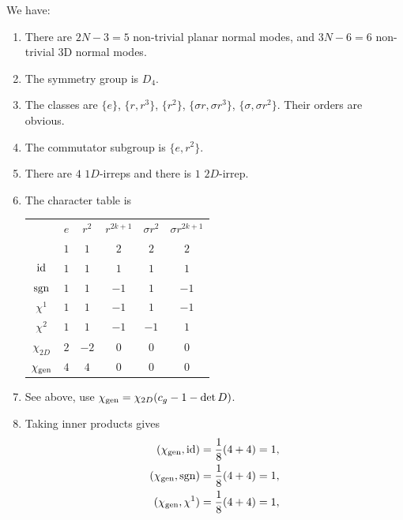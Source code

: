 \documentclass[11pt]{article}
\begin{document}
\begin{eexample}
    [Square]
    We have:
    \begin{enumerate}
        \item There are $2N - 3 = 5$ non-trivial planar normal modes,
        and $3N - 6 = 6$ non-trivial 3D normal modes.
        \item The symmetry group is $D_4$.
        \item The classes are $\{ e \}$, $\{ r, r^3 \}$, $\{ r^2 \}$, $\{ \sigma r, \sigma r^3 \}$, $\{ \sigma, \sigma r^2 \}$.
        Their orders are obvious.
        \item The commutator subgroup is $\{e, r^2 \}$.
        \item There are $4$ $1D$-irreps and there is $1$ $2D$-irrep.
        \item The character table is
        \begin{table}[H]
            \centering 
            \begin{tabular}{|c|c|c|c|c|c|}
                \hline
                & $e$ & $r^2$ & $r^{2k + 1}$ & $\sigma r^2$ & $\sigma r^{2k + 1}$\\
                & $1$ & $1$ & $2$ & $2$ & $2$\\
                \hline
                $\id$ & $1$ & $1$ & $1$ & $1$ & $1$\\
                $\sgn$ & $1$ & $1$ & $-1$ & $1$ & $-1$\\
                $\chi^1$ & $1$ & $1$ & $-1$ & $1$ & $-1$\\
                $\chi^2$ & $1$ & $1$ & $-1$ & $-1$ & $1$\\
                $\chi_{2D}$ & $2$ & $-2$ & $0$ & $0$ & $0$\\
                $\chi_{\rm gen}$ & $4$ & $4$ & $0$ & $0$ & $0$\\
                \hline
            \end{tabular}
        \end{table}
        \item See above, use $\chi_{\rm gen} = \chi_{2D}(c_g - 1 - \det{D})$.
        \item Taking inner products gives
        \begin{align*}
            (\chi_{\rm gen}, \id) & = \frac{1}{8} (4 + 4) = 1,\\
            (\chi_{\rm gen}, \sgn) & = \frac{1}{8} (4 + 4) = 1,\\
            (\chi_{\rm gen}, \chi^1) & = \frac{1}{8} (4 + 4) = 1,\\

\end{align*}
\end{enumerate}
\end{eexample}
\end{document}
